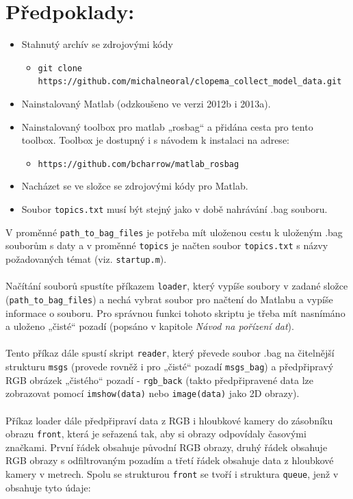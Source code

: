 \documentclass[10pt,a4paper,titlepage,oneside]{report}
\begin{document}
\section{Předpoklady:}
\begin{itemize}
   \item Stahnutý archív se zdrojovými kódy
  \begin{itemize}
  	\item \verb|git clone https://github.com/michalneoral/clopema_collect_model_data.git|
  \end{itemize}
  
  \item Nainstalovaný Matlab (odzkoušeno ve verzi 2012b i 2013a).
  \item Nainstalovaný toolbox pro matlab „rosbag“ a přidána cesta pro tento toolbox. Toolbox je dostupný i s návodem k instalaci na adrese:
  \begin{itemize}
     \item \verb|https://github.com/bcharrow/matlab_rosbag|
  \end{itemize}
  \item Nacházet se ve složce se zdrojovými kódy pro Matlab.
  \item Soubor \verb|topics.txt| musí být stejný jako v době nahrávání .bag souboru.
\end{itemize}

V proměnné \verb|path_to_bag_files| je potřeba mít uloženou cestu k uloženým .bag souborům s daty a v proměnné \verb|topics| je načten soubor \verb|topics.txt| s názvy požadovaných témat (viz. \verb|startup.m|).\\
\\
Načítání souborů spustíte příkazem \verb|loader|, který vypíše soubory v zadané složce (\verb|path_to_bag_files|) a nechá vybrat soubor pro načtení do Matlabu a vypíše informace o souboru. Pro správnou funkci tohoto skriptu je třeba mít nasnímáno a uloženo „čisté“ pozadí (popsáno v kapitole \textit{Návod na pořízení dat}).\\
\\
Tento příkaz dále spustí skript \verb|reader|, který převede soubor .bag na čitelnější strukturu \verb|msgs| (provede rovněž i pro „čisté“ pozadí \verb|msgs_bag|) a předpřipravý RGB obrázek „čistého“ pozadí - \verb|rgb_back| (takto předpřipravené data lze zobrazovat pomocí \verb|imshow(data)| nebo \verb|image(data)| jako 2D obrazy). \\
\\
Příkaz loader dále předpřipraví data z RGB i hloubkové kamery do zásobníku obrazu \verb|front|, která je seřazená tak, aby si obrazy odpovídaly časovými značkami. První řádek obsahuje původní RGB obrazy, druhý řádek obsahuje RGB obrazy s odfiltrovaným pozadím a třetí řádek obsahuje data z hloubkové kamery v metrech.
Spolu se strukturou \verb|front| se tvoří i struktura \verb|queue|, jenž v obsahuje tyto údaje:
\end{document}
